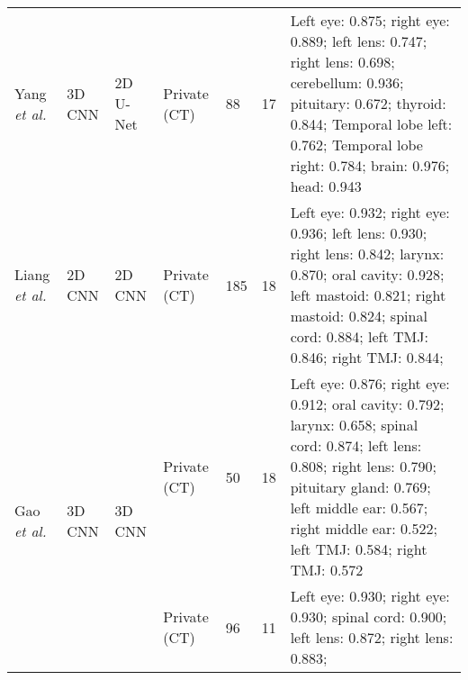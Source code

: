 \documentclass[lettersize,journal]{IEEEtran}
\begin{document}
{\begin{table*}[ht!]
{\begin{tabular}{@{}llllllm{}@{}}
Yang {\it{et al.}} \cite{140}                   & 3D CNN                        & 2D U-Net                      & Private (CT)                          & 88                        & 17                        & Left eye: 0.875; right eye: 0.889; left lens: 0.747; right lens: 0.698; cerebellum: 0.936; pituitary: 0.672; thyroid: 0.844; Temporal lobe left: 0.762; Temporal lobe right: 0.784; brain: 0.976; head: 0.943                                                                                                                                                                                                                              \\
Liang {\it{et al.}} \cite{141}                  & 2D CNN                        & 2D CNN                        & Private (CT)                          & 185                       & 18                        & Left eye: 0.932; right eye: 0.936; left lens: 0.930; right lens: 0.842; larynx: 0.870; oral cavity: 0.928; left mastoid: 0.821; right mastoid: 0.824; spinal cord: 0.884; left TMJ: 0.846; right TMJ: 0.844;                                                                                                                                                                                                                               \\
\multirow{2}{*}{Gao {\it{et al.}} \cite{142}}   & \multirow{2}{*}{3D CNN}       & \multirow{2}{*}{3D CNN}       & Private (CT)                          & 50                        & 18                        & Left eye: 0.876; right eye: 0.912; oral cavity: 0.792; larynx: 0.658; spinal cord: 0.874; left lens: 0.808; right lens: 0.790; pituitary gland: 0.769; left middle ear: 0.567; right middle ear: 0.522; left TMJ: 0.584; right TMJ: 0.572                                                                                                                                                                                                  \\
                                        &                               &                               & Private (CT)                          & 96                        & 11                        & Left eye: 0.930; right eye: 0.930; spinal cord: 0.900; left lens: 0.872; right lens: 0.883;                                                                                                                                                                                                                                                                                                                                                \\

\end{tabular}}
\end{table*}}
\end{document}
